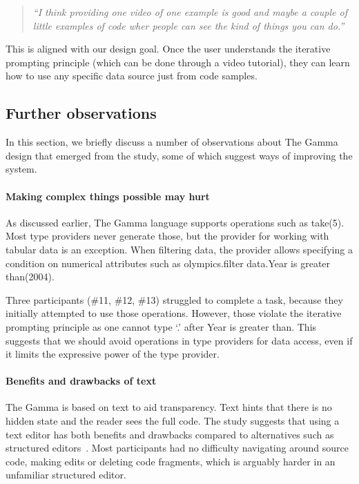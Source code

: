 \documentclass{sigchi}
\newcommand{\ikvd}[1]{{\fontfamily{zi4}\selectfont\small #1}}
\begin{document}
\begin{quote}
  \emph{``I think providing one video of one example is good and maybe a couple of little examples
  of code wher people can see the kind of things you can do.''}
\end{quote}

This is aligned with our design goal. Once the user understands the iterative prompting principle
(which can be done through a video tutorial), they can learn how to use any specific data source
just from code samples.

\subsection{Further observations}
In this section, we briefly discuss a number of observations about The Gamma design that
emerged from the study, some of which suggest ways of improving the system.

\paragraph{Making complex things possible may hurt}
As discussed earlier, The Gamma language supports operations such as \ikvd{take(5)}. Most type
providers never generate those, but the provider for working with tabular data is an exception.
When filtering data, the provider allows specifying a condition on numerical attributes such as
\ikvd{olympics.\textquotesingle filter data\textquotesingle.\textquotesingle Year is greater than\textquotesingle(2004)}.

Three participants (\#11, \#12, \#13) struggled to complete a task, because they
initially attempted to use those operations. However, those violate the iterative prompting
principle as one cannot type `.' after \ikvd{\textquotesingle Year is greater than\textquotesingle}.
This suggests that we should avoid operations in type providers for data access, even if it
limits the expressive power of the type provider.

\paragraph{Benefits and drawbacks of text}
The Gamma is based on text to aid transparency. Text hints that there is no hidden state and
the reader sees the full code. The study suggests that using a text editor has both
benefits and drawbacks compared to alternatives such as structured editors~\cite{structure-based,livenut,lamdu}.
Most participants had no difficulty navigating around source code, making edits or deleting code
fragments, which is arguably harder in an unfamiliar structured editor.
\end{document}
